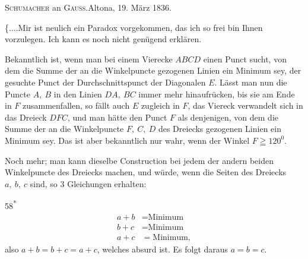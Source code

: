 \clearpage{}\NoSourceHead
{}
\begin{center}\textsc{Schumacher} an \textsc{Gauss}.\quad Altona, 19. März 1836.\end{center}
\indent \{.\enspace.\enspace.\enspace.\quad Mir ist neulich ein Paradox vorgekommen, das ich so frei bin Ihnen vorzulegen. Ich kann es noch nicht genügend erklären.

\indent Bekanntlich ist, wenn man bei einem Vierecke \(ABCD\) einen Punct sucht, von dem die Summe der an die Winkelpuncte gezogenen Linien ein Minimum sey, der gesuchte Punct der Durchschnittspunct der Diagonalen \(E\). Lässt man nun die Puncte \(A,\ B\) in den Linien \(DA,\ BC\) immer mehr hinaufrücken, bis sie am Ende in \(F\) zusammenfallen, so fällt auch \(E\) zugleich in \(F\), das Viereck verwandelt sich in das Dreieck \(DFC\), und man hätte den Punct \(F\) als denjenigen, von dem die Summe der an die Winkelpuncte \(F,\ C,\ D\) des Dreiecks gezogenen Linien ein Minimum sey. Das ist aber bekanntlich nur wahr, wenn der Winkel \(F\geqq120^{0}\).
\begin{center}
\end{center}

\indent Noch mehr; man kann dieselbe Construction bei jedem der andern beiden Winkelpuncte des Dreiecks machen, und würde, wenn die Seiten des Dreiecks \(a,\ b,\ c\) sind, so 3 Gleichungen erhalten:
\par\vfill\noindent\hfill 58\textsuperscript{*}
\clearpage{}
\[
\begin{aligned}
a+b&=\text{Minimum}\\
b+c&=\text{Minimum}\\
a+c&=\text{Minimum},
\end{aligned}
\]
\noindent also \(a+b=b+c=a+c\), welches absurd ist. Es folgt daraus \(a=b=c\).

